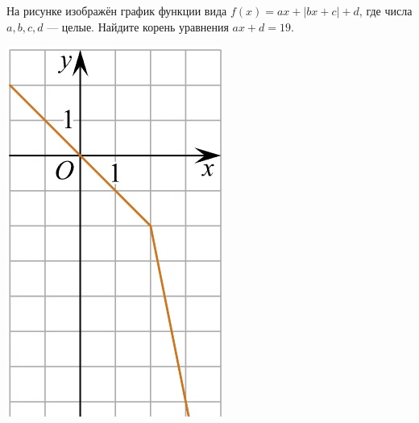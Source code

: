 \begin{class}[number=5]
\begin{listofex}
\begin{minipage}[c]{0.17\textwidth}
		\end{minipage}
		\item
		\begin{minipage}[t]{0.76\textwidth}
			На рисунке изображён график функции вида \(f(x)=ax+|bx+c|+d\), где числа \(a, b, c, d\) --- целые. Найдите корень уравнения \(ax+d=19\).
		\end{minipage}
		\begin{minipage}[c]{0.17\textwidth}
			\includegraphics[align=t, width=\textwidth]{pics/G101M4C5-9.jpg}
		\end{minipage}

\end{listofex}
\end{class}
